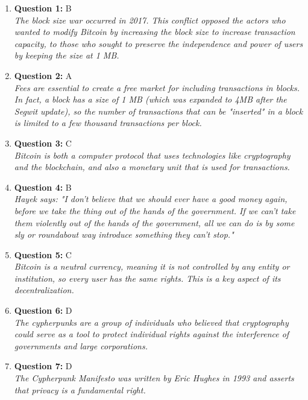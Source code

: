 \documentclass[12pt,a4paper]{article}
\begin{document}
\begin{enumerate}
\item \textbf{Question 1:} B
\\ \textit{The block size war occurred in 2017. This conflict opposed the actors who wanted to modify Bitcoin by increasing the block size to increase transaction capacity, to those who sought to preserve the independence and power of users by keeping the size at 1 MB.}

\item \textbf{Question 2:} A
\\ \textit{Fees are essential to create a free market for including transactions in blocks. In fact, a block has a size of 1 MB (which was expanded to 4MB after the Segwit update), so the number of transactions that can be "inserted" in a block is limited to a few thousand transactions per block.}

\item \textbf{Question 3:} C
\\ \textit{Bitcoin is both a computer protocol that uses technologies like cryptography and the blockchain, and also a monetary unit that is used for transactions.}

\item \textbf{Question 4:} B
\\ \textit{Hayek says: "I don't believe that we should ever have a good money again, before we take the thing out of the hands of the government. If we can't take them violently out of the hands of the government, all we can do is by some sly or roundabout way introduce something they can't stop."}

\item \textbf{Question 5:} C
\\ \textit{Bitcoin is a neutral currency, meaning it is not controlled by any entity or institution, so every user has the same rights. This is a key aspect of its decentralization.}

\item \textbf{Question 6:} D
\\ \textit{The cypherpunks are a group of individuals who believed that cryptography could serve as a tool to protect individual rights against the interference of governments and large corporations.}

\item \textbf{Question 7:} D
\\ \textit{The Cypherpunk Manifesto was written by Eric Hughes in 1993 and asserts that privacy is a fundamental right.}


\end{enumerate}
\end{document}
